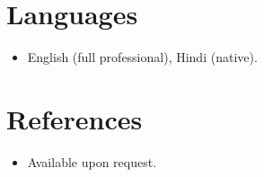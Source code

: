 \documentclass[11pt,a4paper,sans]{moderncv}
\begin{document}

\section{Languages}
\vspace{1pt}
\begin{itemize}
\item {English (full professional), Hindi (native).}
\end{itemize}


\section{References}
\vspace{1pt}
\begin{itemize}
\item{Available upon request.}
\end{itemize}
\end{document}
